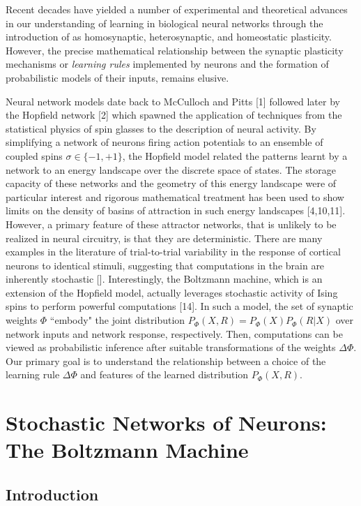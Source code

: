 \documentclass{ucetd}
\begin{document}
Recent decades have yielded a number of experimental and theoretical advances in our understanding of learning in biological neural networks through the introduction of as homosynaptic, heterosynaptic, and homeostatic plasticity. However, the precise mathematical relationship between the synaptic plasticity mechanisms or \emph{learning rules} implemented by neurons and the formation of probabilistic models of their inputs, remains elusive.

Neural network models date back to McCulloch and Pitts [1] followed later by the Hopfield network [2] which spawned the application of techniques from the statistical physics of spin glasses to the description of neural activity. By simplifying a network of neurons firing action potentials to an ensemble of coupled spins $\sigma \in \{-1, +1\}$, the Hopfield model related the patterns learnt by a network to an energy landscape over the discrete space of states. The storage capacity of these networks and the geometry of this energy landscape were of particular interest and rigorous mathematical treatment has been used to show limits on the density of basins of attraction in such energy landscapes [4,10,11]. However, a primary feature of these attractor networks, that is unlikely to be realized in neural circuitry, is that they are deterministic. There are many examples in the literature of trial-to-trial variability in the response of cortical neurons to identical stimuli, suggesting that computations in the brain are inherently stochastic []. Interestingly, the Boltzmann machine, which is an extension of the Hopfield model, actually leverages stochastic activity of Ising spins to perform powerful computations [14]. In such a model, the set of synaptic weights $\Phi$ ``embody" the joint distribution $P_{\Phi}(X,R) = P_{\Phi}(X)P_{\Phi}(R|X)$ over network inputs and network response, respectively. Then, computations can be viewed as probabilistic inference after suitable transformations of the weights $\Delta\Phi$. Our primary goal is to understand the relationship between a choice of the learning rule $\Delta \Phi$ and features of the learned distribution $P_{\Phi}(X,R)$.


\chapter{Stochastic Networks of Neurons: The Boltzmann Machine}
\section{Introduction}
\end{document}
